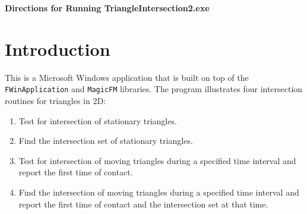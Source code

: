 \documentclass{article}
\newcommand{\Code}[1]{{\tt #1}}
\begin{document}

\begin{center} \large\bf
  Directions for Running TriangleIntersection2.exe
\end{center}

\section{Introduction}

This is a Microsoft Windows application that is built on top of the
\Code{FWinApplication} and \Code{MagicFM} libraries.  The program illustrates
four intersection routines for triangles in 2D:
\begin{enumerate}
  \item  Test for intersection of stationary triangles.
  \item  Find the intersection set of stationary triangles.
  \item  Test for intersection of moving triangles during a specified time
    interval and report the first time of contact.
  \item  Find the intersection of moving triangles during a specified time
    interval and report the first time of contact and the intersection
    set at that time.
\end{enumerate}
\end{document}
